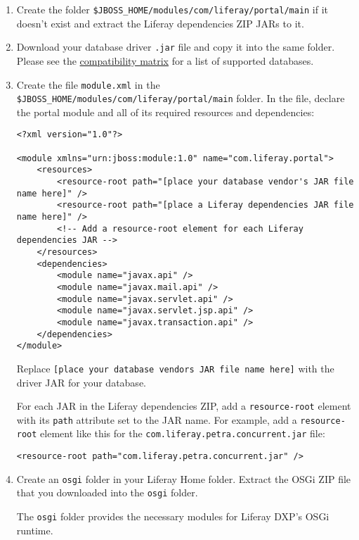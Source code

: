 \begin{enumerate}
\def\labelenumi{\arabic{enumi}.}
\item
  Create the folder
  \texttt{\$JBOSS\_HOME/modules/com/liferay/portal/main} if it doesn't
  exist and extract the Liferay dependencies ZIP JARs to it.
\item
  Download your database driver \texttt{.jar} file and copy it into the
  same folder. Please see the
  \href{https://web.liferay.com/documents/14/21598941/Liferay+DXP+7.1+Compatibility+Matrix/9f9c917a-c620-427b-865d-5c4b4a00be85}{compatibility
  matrix} for a list of supported databases.
\item
  Create the file \texttt{module.xml} in the
  \texttt{\$JBOSS\_HOME/modules/com/liferay/portal/main} folder. In the
  file, declare the portal module and all of its required resources and
  dependencies:

\begin{verbatim}
<?xml version="1.0"?>

<module xmlns="urn:jboss:module:1.0" name="com.liferay.portal">
    <resources>
        <resource-root path="[place your database vendor's JAR file name here]" />
        <resource-root path="[place a Liferay dependencies JAR file name here]" />
        <!-- Add a resource-root element for each Liferay dependencies JAR -->
    </resources>
    <dependencies>
        <module name="javax.api" />
        <module name="javax.mail.api" />
        <module name="javax.servlet.api" />
        <module name="javax.servlet.jsp.api" />
        <module name="javax.transaction.api" />
    </dependencies>
</module>
\end{verbatim}

  Replace
  \texttt{{[}place\ your\ database\ vendor\textquotesingle{}s\ JAR\ file\ name\ here{]}}
  with the driver JAR for your database.

  For each JAR in the Liferay dependencies ZIP, add a
  \texttt{resource-root} element with its \texttt{path} attribute set to
  the JAR name. For example, add a \texttt{resource-root} element like
  this for the \texttt{com.liferay.petra.concurrent.jar} file:

\begin{verbatim}
<resource-root path="com.liferay.petra.concurrent.jar" />
\end{verbatim}
\item
  Create an \texttt{osgi} folder in your Liferay Home folder. Extract
  the OSGi ZIP file that you downloaded into the \texttt{osgi} folder.

  The \texttt{osgi} folder provides the necessary modules for Liferay
  DXP's OSGi runtime.
\end{enumerate}

